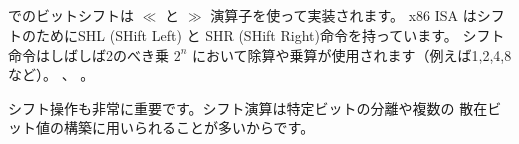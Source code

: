﻿\subsection{\ShiftsSectionName}

\CCpp でのビットシフトは $\ll$ と $\gg$ 演算子を使って実装されます。
x86 \ac{ISA} はシフトのためにSHL (SHift Left) と SHR (SHift Right)命令を持っています。
シフト命令はしばしば2のべき乗 $2^{n}$ において除算や乗算が使用されます（例えば1,2,4,8など）。
、
。


シフト操作も非常に重要です。シフト演算は特定ビットの分離や複数の
散在ビット値の構築に用いられることが多いからです。
